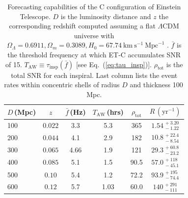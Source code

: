 \documentclass{aa}
\newcommand\T{\rule{0pt}{2.6ex}}       %
\newcommand\B{\rule[-1.2ex]{0pt}{0pt}} %
\begin{document}
%
%
%
%
\begin{table}[h]
\caption{Forecasting capabilities of the C configuration of Einstein Telescope. 
$D$ is the luminosity distance and $z$ the corresponding redshift 
computed assuming a flat $\Lambda$CDM universe with $\Omega_\Lambda = 0.6911, \Omega_m = 0.3089, H_0 = 67.74~\mathrm{km}~\mathrm{s}^{-1}~\mathrm{Mpc}^{-1}$ \citep{Planck2015}.
$\bar{f}$ is the threshold frequency at which ET-C accumulates SNR of 15.
$T_\text{AW}\equiv \tau_\text{insp}(\bar{f})$ [see Eq.~(\ref{eq:tau_insp})].
$\rho_\text{tot}$ is the total SNR for each inspiral.
Last column lists the event rates %
within concentric shells of radius $D$ and thickness 100\,Mpc.}
\label{table:ET}
\centering
\begin{tabular}{lccccc}
\hline\hline
$D\,$(Mpc) &  $z$ & $\bar{f}\,$(Hz) &  $T_\text{AW}\,$(hrs)& ${\rho}_\text{tot}$ &$ R\,(\text{yr}^{-1})$ \T\B \\
\hline
100 & $ 0.022$ & 3.3 & 5.3 & 365 & $1.54^{\,+3.20}_{\,-1.22}$ \T \B \\
200 & $ 0.044$ & 4.1 & 2.9 & 182 & $10.8^{\,+22.4}_{\,-8.54}$ \T \B \\
300 & $ 0.065$ & 4.66 & 1.9 & 121 & $29.3^{\,+60.8}_{\,-23.2}$ \T \B \\
400 & $ 0.085$ & 5.1 & 1.5 & 90.5 & $57.0^{\,+118}_{\,-45.1}$ \T \B \\
500 & $ 0.10$ & 5.4 & 1.2 & 72.2 & $93.9^{\,+195}_{\,-74.4}$ \T \B \\
600 & $ 0.12$ & 5.7 & 1.03 & 60.0 & $140^{\,+291}_{\,-111}$ \T \B \\
\hline\hline
\end{tabular}
\end{table}
%
%
%
%
%
%
%
\end{document}
